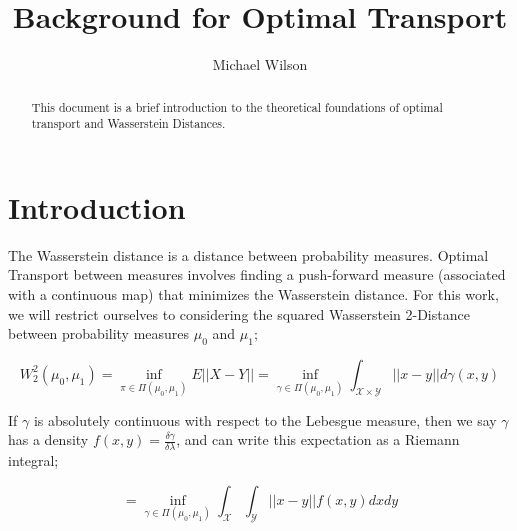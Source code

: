 \documentclass[]{article}
\title{Background for Optimal Transport}
\author{Michael Wilson}
\date{}
\begin{document}
	
	\maketitle
	
	\begin{abstract}
		This document is a brief introduction to the theoretical foundations of optimal transport and Wasserstein Distances.
	\end{abstract}
	
	\section{Introduction}
	
	The Wasserstein distance is a distance between probability measures. Optimal Transport between measures involves finding a push-forward measure (associated with a continuous map) that minimizes the Wasserstein distance. For this work, we will restrict ourselves to considering the squared Wasserstein 2-Distance between probability measures $\mu_0$ and $\mu_1$;
	
	\begin{equation}
		W_2^2(\mu_0, \mu_1) = \inf_{\pi \in \Pi(\mu_0, \mu_1)} E||X - Y|| = \inf_{\gamma \in \Pi(\mu_0, \mu_1)} \int_{\mathcal{X}\times\mathcal{Y}} ||x - y|| d\gamma(x,y)
	\end{equation}
	
	If $\gamma$ is absolutely continuous with respect to the Lebesgue measure, then we say $\gamma$ has a density $f(x,y) = \frac{\delta \gamma}{\delta \lambda}$, and can write this expectation as a Riemann integral;
	
	\begin{equation}
		= \inf_{\gamma \in \Pi(\mu_0, \mu_1)}\int_{\mathcal{X}}\int_{\mathcal{Y}} ||x - y||f(x,y) dx dy
	\end{equation}
	
%	
%	
%	
 	
	



	
\end{document}
